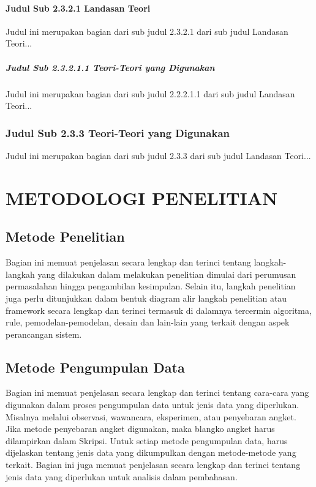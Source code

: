 \documentclass[oneside,listof=totoc]{scrbook}
\begin{document}
\subsubsection{Judul Sub 2.3.2.1 Landasan Teori}
Judul ini merupakan bagian dari sub judul 2.3.2.1 dari sub judul Landasan Teori...

\paragraph{Judul Sub 2.3.2.1.1 Teori-Teori yang Digunakan}
Judul ini merupakan bagian dari sub judul 2.2.2.1.1 dari sub judul Landasan Teori...

\subsection{Judul Sub 2.3.3 Teori-Teori yang Digunakan}
Judul ini merupakan bagian dari sub judul 2.3.3 dari sub judul Landasan Teori...

\chapter{METODOLOGI PENELITIAN}

\vspace{0.5cm}

\section{Metode Penelitian}
Bagian ini memuat penjelasan secara lengkap dan terinci tentang langkah-langkah yang dilakukan dalam melakukan penelitian dimulai dari perumusan permasalahan hingga pengambilan kesimpulan. Selain itu, langkah penelitian juga perlu ditunjukkan dalam bentuk diagram alir langkah penelitian atau framework secara lengkap dan terinci termasuk di dalamnya tercermin algoritma, rule, pemodelan-pemodelan, desain dan lain-lain yang terkait dengan aspek perancangan sistem.

\section{Metode Pengumpulan Data}
Bagian ini memuat penjelasan secara lengkap dan terinci tentang cara-cara yang digunakan dalam proses pengumpulan data untuk jenis data yang diperlukan. Misalnya melalui observasi, wawancara, eksperimen, atau penyebaran angket. Jika metode penyebaran angket digunakan, maka blangko angket harus dilampirkan dalam Skripsi. Untuk setiap metode pengumpulan data, harus dijelaskan tentang jenis data yang dikumpulkan dengan metode-metode yang terkait. Bagian ini juga memuat penjelasan secara lengkap dan terinci tentang jenis data yang diperlukan untuk analisis dalam pembahasan.
\end{document}
